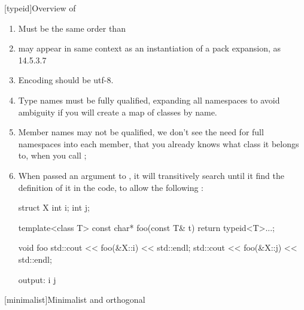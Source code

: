 [typeid]{Overview of }
\begin{enumerate}
\item Must be the same order than 
\item {} may appear in same context as an instantiation of a pack expansion, as 14.5.3.7 \cite[N4296]{N4296}
\item Encoding should be utf-8.
\item Type names must be fully qualified, expanding all namespaces to avoid ambiguity if you will create a map of classes by name.
\item Member names may not be qualified, we don't see the need for full namespaces into each member, that you already knows what class it belongs to, when you call ;
\item When passed an argument to , it will transitively search until it find the definition of it in the code, to allow the following :
\begin{codeblock}
struct X {
 int i;
 int j;
}

template<class T>
const char* foo(const T& t) {
 return typeid<T>...;
}

void foo {
 std::cout << foo(&X::i) << std::endl;
 std::cout << foo(&X::j) << std::endl;
}

output:
i
j
\end{codeblock}
\end{enumerate}
[minimalist]{Minimalist and orthogonal}
